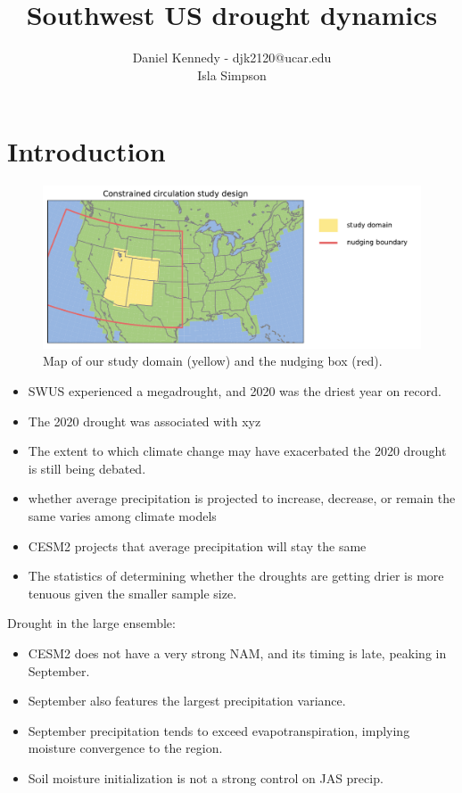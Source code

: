 \documentclass[11pt]{article}
\title{Southwest US drought dynamics \large \\}
\author{Daniel Kennedy - djk2120@ucar.edu \\ Isla Simpson }
\begin{document}
\maketitle

\section{Introduction}

\begin{figure}[h]
\centering
\includegraphics[width=40pc]{figs/domain.pdf}
\caption{Map of our study domain (yellow) and the nudging box (red).}
\label{fig:domain}
\end{figure}


\begin{itemize}
    \item SWUS experienced a megadrought, and 2020 was the driest year on record.
    \item The 2020 drought was associated with xyz
    \item The extent to which climate change may have exacerbated the 2020 drought is still being debated.
    \item whether average precipitation is projected to increase, decrease, or remain the same varies among climate models
    \item CESM2 projects that average precipitation will stay the same
    \item The statistics of determining whether the droughts are getting drier is more tenuous given the smaller sample size.
\end{itemize}


Drought in the large ensemble:
\begin{itemize}
    \item CESM2 does not have a very strong NAM, and its timing is late, peaking in September.
    \item September also features the largest precipitation variance.
    \item September precipitation tends to exceed evapotranspiration, implying moisture convergence to the region. 
    \item Soil moisture initialization is not a strong control on JAS precip.
    
    
\end{itemize}



\nocite{*}

\end{document}
